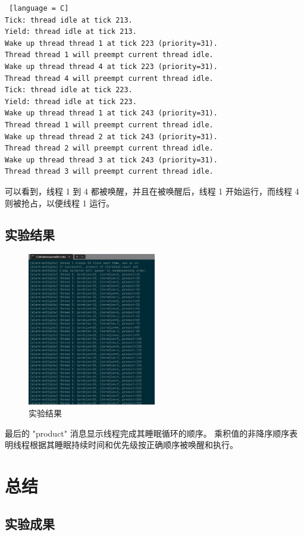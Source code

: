 \begin{lstlisting} [language = C]
Tick: thread idle at tick 213.
Yield: thread idle at tick 213.
Wake up thread thread 1 at tick 223 (priority=31).
Thread thread 1 will preempt current thread idle.
Wake up thread thread 4 at tick 223 (priority=31).
Thread thread 4 will preempt current thread idle.
Tick: thread idle at tick 223.
Yield: thread idle at tick 223.
Wake up thread thread 1 at tick 243 (priority=31).
Thread thread 1 will preempt current thread idle.
Wake up thread thread 2 at tick 243 (priority=31).
Thread thread 2 will preempt current thread idle.
Wake up thread thread 3 at tick 243 (priority=31).
Thread thread 3 will preempt current thread idle.
\end{lstlisting}

可以看到，线程 1 到 4 都被唤醒，并且在被唤醒后，线程 1 开始运行，而线程 4 则被抢占，以便线程 1 运行。


\subsection{实验结果}

\begin{figure}[H]
  \centering
  \includegraphics[width=0.5\textwidth]{img4/final.png}
  \caption{实验结果}
  \label{fig:pintos}
\end{figure}

最后的 "product" 消息显示线程完成其睡眠循环的顺序。
乘积值的非降序顺序表明线程根据其睡眠持续时间和优先级按正确顺序被唤醒和执行。


\section{总结}

\subsection{实验成果}

